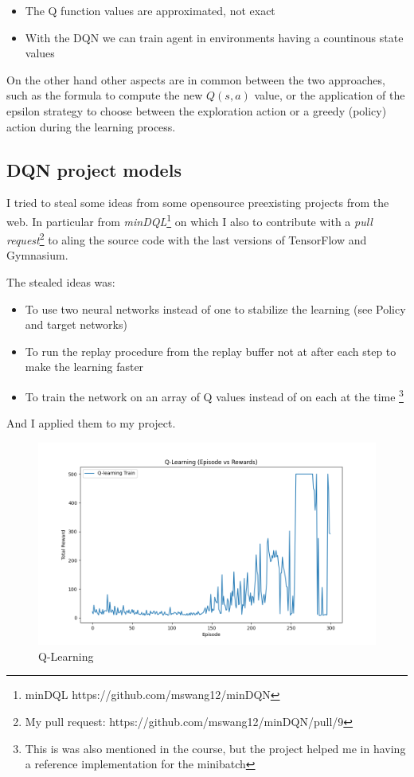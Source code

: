 \documentclass{article}
\begin{document}
\begin{itemize}
  \item{The Q function values are approximated, not exact}
  \item{With the DQN we can train agent in environments having a countinous state values}
\end{itemize}

On the other hand other aspects are in common between the two approaches, such as
the formula to compute the new $Q(s,a)$ value, or the application of the epsilon strategy
to choose between the exploration action or a greedy (policy) action during the learning process.

\subsection{DQN project models}

I tried to steal some ideas from some opensource preexisting projects from the web.
In particular from \emph{minDQL}\footnote{minDQL https://github.com/mswang12/minDQN} on which I also to contribute with 
a \emph{pull request}\footnote{My pull request: https://github.com/mswang12/minDQN/pull/9} 
to aling the source code with the last versions of TensorFlow and Gymnasium.

The stealed ideas was:

\begin{itemize}
  \item{To use two neural networks instead of one to stabilize the learning (see Policy and target networks)}
  \item{To run the replay procedure from the replay buffer not at after each step to make the learning faster}
  \item{To train the network on an array of Q values instead of on each at the time
  \footnote{This is was also mentioned in the course, but the project helped me in having a reference implementation for the minibatch}}
\end{itemize}

And I applied them to my project.

\begin{figure}
  \includegraphics[width=\linewidth]{DQN.png}
  \caption{Q-Learning}
  \label{fig:dqn-1}
\end{figure}
\end{document}
